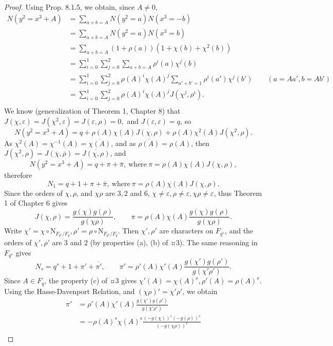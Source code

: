 \documentclass[11pt,a4paper]{article}
\begin{document}
\begin{proof}
 Using Prop. 8.1.5, we obtain, since $A\ne 0$,
\begin{align*}
N(y^2=x^3+A)  &= \sum\limits_{a+b=A} N(y^2=a) N(x^3 =-b)\\
&= \sum\limits_{a+b=A} N(y^2=a) N(x^3=b)\\
&= \sum\limits_{a+b=A}(1+\rho(a))(1+\chi(b)+\chi^2(b))\\
&=\sum\limits_{i=0}^1\sum\limits_{j=0}^2\sum\limits_{a+b=A} \rho^i(a) \chi^j(b)\\
&=\sum\limits_{i=0}^1\sum\limits_{j=0}^2\rho(A)^i \chi(A)^j\sum\limits_{a'+b'=1} \rho^i(a') \chi^j(b')\qquad (a = Aa', b = A b')\\
&=\sum\limits_{i=0}^1\sum\limits_{j=0}^2\rho(A)^i \chi(A)^j J(\chi^j,\rho^i).\\
\end{align*}
We know (generalization of Theorem 1, Chapter 8) that  $J(\chi,\varepsilon)=J(\chi^2,\varepsilon)=J(\varepsilon,\rho)=0,$ and $J(\varepsilon,\varepsilon)=q$, so
$$N(y^2=x^3+A) = q+ \rho(A)\chi(A) J(\chi,\rho) + \rho(A) \chi^2(A) J(\chi^2,\rho).$$
As $\chi^2(A) = \chi^{-1}(A) = \overline{\chi(A)}$, and as $\overline{\rho(A)} = \rho(A)$, then $J(\chi^2,\rho) =  J(\overline{\chi},\overline{\rho}) = \overline{J(\chi,\rho)}$, and
$$N(y^2 = x^3+A) = q +\pi + \bar{\pi},\ \mathrm{where}\ \pi = \rho(A) \chi(A) J(\chi,\rho),$$
therefore
$$N_1 = q + 1 + \pi + \bar{\pi},\ \mathrm{where}\ \pi = \rho(A) \chi(A) J(\chi,\rho).$$
Since the orders of $\chi, \rho$, and $\chi \rho$ are $3,2$ and $6$, $\chi \ne \varepsilon, \rho \ne \varepsilon, \chi \rho \ne \varepsilon$, thus Theorem 1 of Chapter 6 gives
$$J(\chi,\rho) = \frac{g(\chi) g(\rho)}{g(\chi \rho)}, \qquad \pi = \rho(A) \chi(A) \frac{g(\chi) g(\rho)}{g(\chi \rho)}.$$
Write $\chi' = \chi \circ \mathrm{N}_{F_{q^s}/F_q}, \rho' = \rho \circ \mathrm{N}_{F_{q^s}/F_q}$. Then $\chi', \rho'$ are characters on $F_{q^s}$, and the orders of $\chi', \rho'$ are $3$ and $2$ (by properties (a), (b) of ¤3). The same reasoning in $F_{q^s}$ gives
$$N_s = q^s + 1 + \pi' + \overline{\pi'}, \qquad \pi' = \rho'(A) \chi'(A) \frac{g(\chi') g(\rho')}{g(\chi' \rho')}.$$
Since $A \in F_q$, the property (c) of ¤3 gives $\chi'(A) = \chi(A)^s, \rho'(A) = \rho(A)^s$. Using the Hasse-Davenport  Relation, and $(\chi \rho)' = \chi' \rho'$, we obtain
\begin{align*}
\pi' &= \rho'(A) \chi'(A) \frac{g(\chi') g(\rho')}{g(\chi' \rho')}\\
&=-\rho(A)^s \chi(A)^s \frac{(-g(\chi))^s (-g(\rho))^s}{(-g(\chi \rho))^s}\\

\end{align*}
\end{proof}
\end{document}
